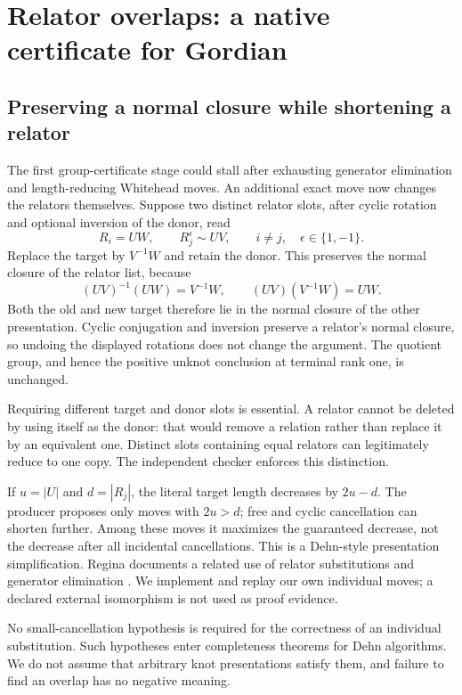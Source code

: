 \section{Relator overlaps: a native certificate for Gordian}
\label{sec:relator-overlap}

\subsection{Preserving a normal closure while shortening a relator}

The first group-certificate stage could stall after exhausting generator
elimination and length-reducing Whitehead moves.  An additional exact move
now changes the relators themselves.  Suppose two distinct relator slots,
after cyclic rotation and optional inversion of the donor, read
\[
 R_i=UW,\qquad R_j^{\epsilon}\sim UV,
 \qquad i\ne j,\quad \epsilon\in\{1,-1\}.
\]
Replace the target by $V^{-1}W$ and retain the donor.  This preserves the
normal closure of the relator list, because
\[
 (UV)^{-1}(UW)=V^{-1}W,\qquad
 (UV)(V^{-1}W)=UW.
\]
Both the old and new target therefore lie in the normal closure of the
other presentation.  Cyclic conjugation and inversion preserve a relator's
normal closure, so undoing the displayed rotations does not change the
argument.  The quotient group, and hence the positive unknot conclusion
at terminal rank one, is unchanged.

Requiring different target and donor slots is essential.  A relator cannot
be deleted by using itself as the donor: that would remove a relation
rather than replace it by an equivalent one.  Distinct slots containing
equal relators can legitimately reduce to one copy.  The independent
checker enforces this distinction.

If $u=|U|$ and $d=|R_j|$, the literal target length decreases by
$2u-d$.  The producer proposes only moves with $2u>d$; free and cyclic
cancellation can shorten further.  Among these moves it maximizes the
guaranteed decrease, not the decrease after all incidental cancellations.
This is a Dehn-style presentation simplification.  Regina documents a
related use of relator substitutions and generator elimination
\cite{regina-group-simplify}.  We implement and replay our own individual
moves; a declared external isomorphism is not used as proof evidence.

No small-cancellation hypothesis is required for the correctness of an
individual substitution.  Such hypotheses enter completeness theorems
for Dehn algorithms.  We do not assume that arbitrary knot presentations
satisfy them, and failure to find an overlap has no negative meaning.

